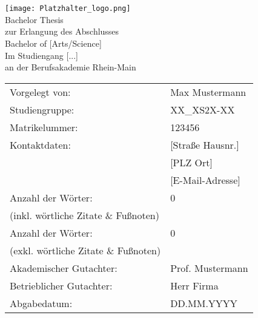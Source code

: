 \begin{center}
     \\
     \\[3ex]%
    \texttt{[image: Platzhalter\_logo.png]} \\[3ex]
    \large{Bachelor Thesis\\ [-10pt]
        zur Erlangung des Abschlusses\\ [-10pt]
        Bachelor of [Arts/Science]\\
        Im Studiengang [...]\\ [-10pt]
        an der Berufsakademie Rhein-Main
}
\end{center}

\renewcommand{\arraystretch}{2.2}%
\begin{table}[h]
    \setlength{\tabcolsep}{32pt}
    \begin{tabularx}{\textwidth}{l l}
        Vorgelegt von:                       & Max Mustermann   \\ [-15pt]
        Studiengruppe:                       & XX\_XS2X-XX      \\ [-15pt]
        Matrikelummer:                       & 123456           \\ [-15pt]
        Kontaktdaten:                        & [Straße Hausnr.] \\ [-15pt]
        ~                                    & [PLZ Ort]        \\ [-15pt]
        ~                                    & [E-Mail-Adresse] \\
        Anzahl der Wörter:                   & 0                \\ [-18pt]
        (inkl. wörtliche Zitate \& Fußnoten) & ~                \\
        Anzahl der Wörter:                   & 0                \\ [-18pt]
        (exkl. wörtliche Zitate \& Fußnoten) & ~                \\
        Akademischer Gutachter:              & Prof. Mustermann \\ [-15pt]
        Betrieblicher Gutachter:             & Herr Firma       \\
        Abgabedatum:                         & DD.MM.YYYY       \\
    \end{tabularx}
\end{table}